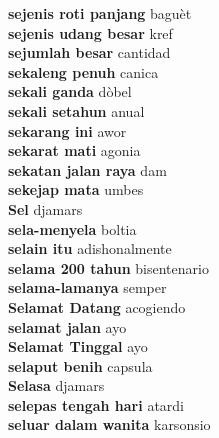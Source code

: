 \textbf{ sejenis roti panjang  } baguèt \\
\textbf{ sejenis udang besar  } kref \\
\textbf{ sejumlah besar  } cantidad \\
\textbf{ sekaleng penuh  } canica \\
\textbf{ sekali ganda  } dòbel \\
\textbf{ sekali setahun  } anual \\
\textbf{ sekarang ini  } awor \\
\textbf{ sekarat mati  } agonia \\
\textbf{ sekatan jalan raya  } dam \\
\textbf{ sekejap mata  } umbes \\
\textbf{ Sel  } djamars \\
\textbf{ sela-menyela  } boltia \\
\textbf{ selain itu  } adishonalmente \\
\textbf{ selama 200 tahun  } bisentenario \\
\textbf{ selama-lamanya  } semper \\
\textbf{ Selamat Datang  } acogiendo \\
\textbf{ selamat jalan  } ayo \\
\textbf{ Selamat Tinggal  } ayo \\
\textbf{ selaput benih  } capsula \\
\textbf{ Selasa  } djamars \\
\textbf{ selepas tengah hari  } atardi \\
\textbf{ seluar dalam wanita  } karsonsio \\
